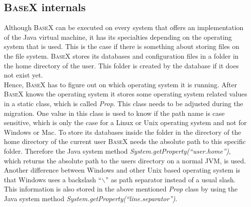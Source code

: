 \subsection{\textsc{BaseX} internals}
\label{sec:migration:basex-internals}
Although \textsc{BaseX} can be executed on every system that offers an implementation of the Java virtual machine, it has its specialties depending on the operating system that is used.
This is the case if there is something about storing files on the file system.
\textsc{BaseX} stores its databases and configuration files in a folder in the home directory of the user.
This folder is created by the database if it does not exist yet.\\
Hence, \textsc{BaseX} has to figure out on which operating system it is running.
After \textsc{BaseX} knows the operating system it stores some operating system related values in a static class, which is called \textit{Prop}. 
This class needs to be adjusted during the migration.
One value in this class is used to know if the path name is case sensitive, which is only the case for a Linux or Unix operating system and not for Windows or Mac.
To store its databases inside the folder in the directory of the home directory of the current user \textsc{BaseX} needs the absolute path to this specific folder.
Therefore the Java system method \textit{System.getProperty(``user.home'')}, which returns the absolute path to the users directory on a normal JVM, is used.\\
Another difference between Windows and other Unix based operating system is that Windows uses a backslash ``\textit{$\backslash$}'' as path separator instead of a usual slash.
This information is also stored in the above mentioned \textit{Prop} class by using the Java system method \textit{System.getProperty(``line.separator'')}.

